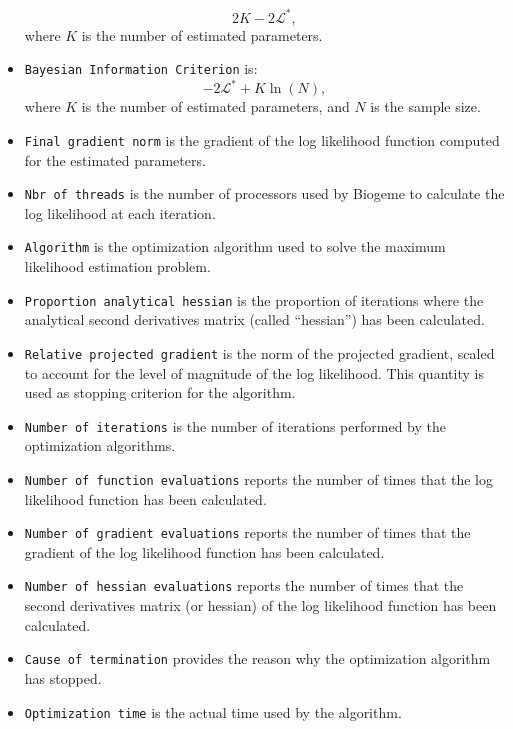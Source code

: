 \documentclass[12pt,a4paper]{article}
\begin{document}
\begin{itemize}
         \begin{equation}
          2 K - 2 \mathcal{L}^*,
         \end{equation}
         where $K$ is the number of estimated parameters.
       \item \texttt{Bayesian Information Criterion} is:
         \begin{equation}
 - 2 \mathcal{L}^* + K \ln(N),
         \end{equation}
         where  $K$ is the number of estimated parameters, and $N$ is
         the sample size. 
      \item \texttt{Final gradient norm} is the gradient of the log
        likelihood function computed for the estimated parameters.
      \item \texttt{Nbr of threads} is the number of processors used
        by Biogeme to calculate the log likelihood at each iteration.
       \item \texttt{Algorithm} is the optimization algorithm used to
         solve the maximum likelihood estimation problem.
        \item \texttt{Proportion analytical hessian} is the proportion
          of iterations where the analytical second derivatives matrix
          (called ``hessian'') has been calculated.
         \item \texttt{Relative projected gradient} is the norm of the
           projected gradient, scaled to account for the level of
           magnitude of the log likelihood. This quantity is used as
           stopping criterion for the algorithm.
         \item \texttt{Number of iterations} is the number of
           iterations performed by the optimization algorithms.
         \item \texttt{Number of function evaluations} reports the
           number of times that the log likelihood function has been
           calculated.
         \item \texttt{Number of gradient evaluations} reports the
           number of times that the gradient of the log likelihood function has been
           calculated.
         \item \texttt{Number of hessian evaluations} reports the
           number of times that the second derivatives matrix (or
           hessian) of the log likelihood function has been
           calculated.
         \item \texttt{Cause of termination} provides the reason why
           the optimization algorithm has stopped. 
         \item \texttt{Optimization time} is the actual time used by the algorithm.
   \end{itemize}
\end{document}
